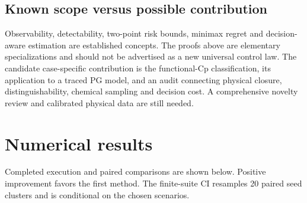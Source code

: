 \documentclass[
  11pt,
]{article}
\begin{document}
\hypertarget{known-scope-versus-possible-contribution}{%
\subsection{Known scope versus possible
contribution}\label{known-scope-versus-possible-contribution}}

Observability, detectability, two-point risk bounds, minimax regret and
decision-aware estimation are established concepts. The proofs above are
elementary specializations and should not be advertised as a new
universal control law. The candidate case-specific contribution is the
functional-Cp classification, its application to a traced PG model, and
an audit connecting physical closure, distinguishability, chemical
sampling and decision cost. A comprehensive novelty review and
calibrated physical data are still needed.

\hypertarget{numerical-results}{%
\section{Numerical results}\label{numerical-results}}

Completed execution and paired comparisons are shown below. Positive
improvement favors the first method. The finite-suite CI resamples 20
paired seed clusters and is conditional on the chosen scenarios.

\begingroup\footnotesize
\end{document}
